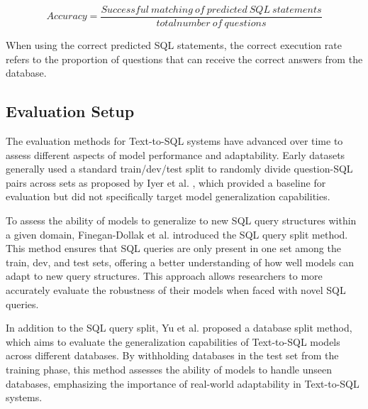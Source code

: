 \begin{equation}
    Accuracy = \frac{Successful\ matching\ of\ predicted\ SQL\ statements}{total number\ of\ questions}
    \label{fig:acc1}
\end{equation}

When using the correct predicted SQL statements, the correct execution rate refers to the proportion of questions that can receive the correct answers from the database.



\subsection*{Evaluation Setup}

The evaluation methods for Text-to-SQL systems have advanced over time to assess different aspects of model performance and adaptability. Early datasets generally used a standard train/dev/test split to randomly divide question-SQL pairs across sets as proposed by Iyer et al. \cite{iyer-etal-2017-learning}, which provided a baseline for evaluation but did not specifically target model generalization capabilities.

To assess the ability of models to generalize to new SQL query structures within a given domain, Finegan-Dollak et al. \cite{finegan-dollak-etal-2018-improving} introduced the SQL query split method. This method ensures that SQL queries are only present in one set among the train, dev, and test sets, offering a better understanding of how well models can adapt to new query structures. This approach allows researchers to more accurately evaluate the robustness of their models when faced with novel SQL queries.

In addition to the SQL query split, Yu et al. \cite{yu_spider_2019} proposed a database split method, which aims to evaluate the generalization capabilities of Text-to-SQL models across different databases. By withholding databases in the test set from the training phase, this method assesses the ability of models to handle unseen databases, emphasizing the importance of real-world adaptability in Text-to-SQL systems.

